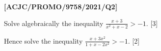 \item \textbf{{[}ACJC/PROMO/9758/2021/Q2{]}} 

Solve algebraically the inequality $\frac{x+3}{x^{2}+x-2}>-1$. \hfill{}{[}3{]}

Hence solve the inequality $\frac{x+3x^{2}}{1+x-2x^{2}}>-1.$ \hfill{}{[}2{]}